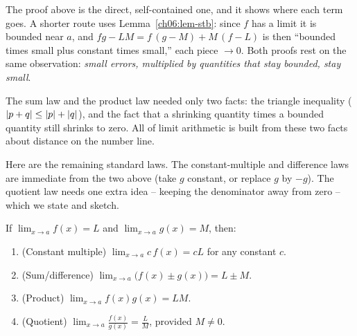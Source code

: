 \begin{remark}
\label{ch06:rem-prod}
The proof above is the direct, self-contained one, and it shows where each
term goes. A shorter route uses Lemma~\ref{ch06:lem-stb}: since $f$ has a limit it
is bounded near $a$, and $fg-LM = f\,(g-M) + M\,(f-L)$ is then ``bounded times
small plus constant times small,'' each piece $\to 0$. Both proofs rest on the
same observation: \emph{small errors, multiplied by quantities that stay
bounded, stay small}.
\end{remark}

\begin{aestheticbox}
The sum law and the product law needed only two facts:
the triangle inequality ($\lvert p+q\rvert\le\lvert p\rvert+\lvert q\rvert$), and the fact that
a shrinking quantity times a bounded quantity still shrinks to zero.
All of limit arithmetic is built from these two facts about distance on the number line.
\end{aestheticbox}

Here are the remaining standard laws. The constant-multiple and
difference laws are immediate from the two above (take $g$ constant, or replace
$g$ by $-g$). The quotient law needs one extra idea -- keeping the denominator
away from zero -- which we state and sketch.

\begin{theorem}
\label{ch06:thm-laws}
If $\lim_{x\to a}f(x)=L$ and $\lim_{x\to a}g(x)=M$, then:
\begin{enumerate}
\item (Constant multiple) $\displaystyle\lim_{x\to a} c\,f(x) = cL$ for any
  constant $c$.
\item (Sum/difference) $\displaystyle\lim_{x\to a}\big(f(x)\pm g(x)\big) = L\pm M$.
\item (Product) $\displaystyle\lim_{x\to a} f(x)g(x) = LM$.
\item (Quotient) $\displaystyle\lim_{x\to a}\frac{f(x)}{g(x)} = \frac{L}{M}$,
  provided $M\ne 0$.
\end{enumerate}
\end{theorem}

